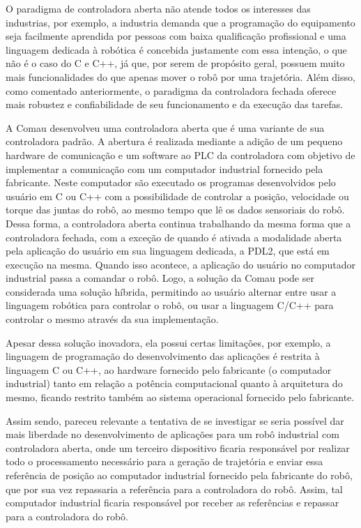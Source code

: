         O paradigma de controladora aberta não atende todos os interesses das industrias, por exemplo, a industria demanda que a programação do equipamento seja facilmente aprendida por pessoas com baixa qualificação profissional e uma linguagem dedicada à robótica é concebida justamente com essa intenção, o que não é o caso do C e C++, já que, por serem de propósito geral, possuem muito mais funcionalidades do que apenas mover o robô por uma trajetória. Além disso, como comentado anteriormente, o paradigma da controladora fechada oferece mais robustez e confiabilidade de seu funcionamento e da execução das tarefas. 
        
        A Comau desenvolveu uma controladora aberta que é uma variante de sua controladora padrão. A abertura é realizada mediante a adição de um pequeno hardware de comunicação e um software ao PLC da controladora com objetivo de implementar a comunicação com um computador industrial fornecido pela fabricante. Neste computador são executado os programas desenvolvidos pelo usuário em C ou C++ com a possibilidade de controlar a posição, velocidade ou torque das juntas do robô, ao mesmo tempo que lê os dados sensoriais do robô. Dessa forma, a controladora aberta continua trabalhando da mesma forma que a controladora fechada, com a exceção de quando é ativada a modalidade aberta pela aplicação do usuário em sua linguagem dedicada, a PDL2, que está em execução na mesma. Quando isso acontece, a aplicação do usuário no computador industrial passa a comandar o robô. Logo, a solução da Comau pode ser considerada uma solução híbrida, permitindo ao usuário alternar entre usar a linguagem robótica para controlar o robô, ou usar a linguagem C/C++ para controlar o mesmo através da sua implementação.
        
        Apesar dessa solução inovadora, ela possui certas limitações, por exemplo, a linguagem de programação do desenvolvimento das aplicações é restrita à linguagem C ou C++, ao hardware fornecido pelo fabricante (o computador industrial) tanto em relação a potência computacional quanto à arquitetura do mesmo, ficando restrito também ao sistema operacional fornecido pelo fabricante.
        
        Assim sendo, pareceu relevante a tentativa de se investigar se seria possível dar mais liberdade no desenvolvimento de aplicações para um robô industrial com controladora aberta, onde um terceiro dispositivo ficaria responsável por realizar todo o processamento necessário para a geração de trajetória e enviar essa referência de posição ao computador industrial fornecido pela fabricante do robô, que por sua vez repassaria a referência para a controladora do robô. Assim, tal computador industrial ficaria responsável por receber as referências e repassar para a controladora do robô.
        
